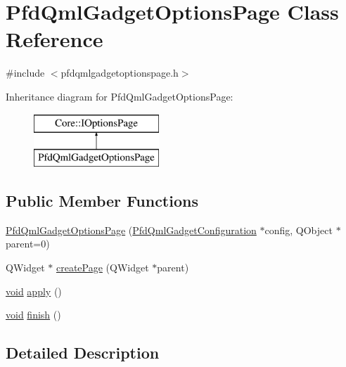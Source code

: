 \hypertarget{class_pfd_qml_gadget_options_page}{\section{\-Pfd\-Qml\-Gadget\-Options\-Page \-Class \-Reference}
\label{class_pfd_qml_gadget_options_page}
}


{\ttfamily \#include $<$pfdqmlgadgetoptionspage.\-h$>$}

\-Inheritance diagram for \-Pfd\-Qml\-Gadget\-Options\-Page\-:\begin{figure}[H]
\begin{center}
\leavevmode
\includegraphics[height=2.000000cm]{class_pfd_qml_gadget_options_page}
\end{center}
\end{figure}
\subsection*{\-Public \-Member \-Functions}
\begin{DoxyCompactItemize}
\item 
\hyperlink{class_pfd_qml_gadget_options_page_aa4d5aa5c42951b4b4c9a8afa08117b72}{\-Pfd\-Qml\-Gadget\-Options\-Page} (\hyperlink{class_pfd_qml_gadget_configuration}{\-Pfd\-Qml\-Gadget\-Configuration} $\ast$config, \-Q\-Object $\ast$parent=0)
\item 
\-Q\-Widget $\ast$ \hyperlink{class_pfd_qml_gadget_options_page_ae93296a6ba03258443fbf00c3a2bec21}{create\-Page} (\-Q\-Widget $\ast$parent)
\item 
\hyperlink{group___u_a_v_objects_plugin_ga444cf2ff3f0ecbe028adce838d373f5c}{void} \hyperlink{class_pfd_qml_gadget_options_page_a5bd6100058d1eadcba93dde902bf1013}{apply} ()
\item 
\hyperlink{group___u_a_v_objects_plugin_ga444cf2ff3f0ecbe028adce838d373f5c}{void} \hyperlink{class_pfd_qml_gadget_options_page_af1bb22d6d6f54295e1ae576da4f9f89d}{finish} ()
\end{DoxyCompactItemize}


\subsection{\-Detailed \-Description}


